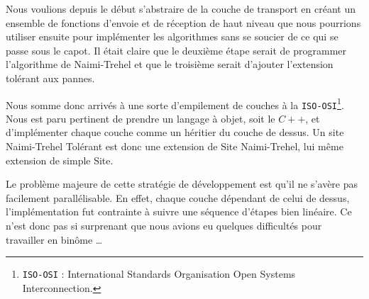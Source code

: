 Nous voulions depuis le début s'abstraire de la couche de transport en créant un ensemble de fonctions d'envoie et de réception de haut niveau que nous pourrions utiliser ensuite pour implémenter les algorithmes sans se soucier de ce qui se passe \og sous le capot\fg{}. Il était claire que le deuxième étape serait de programmer l'algorithme de Naimi-Trehel et que le troisième serait d'ajouter l'extension tolérant aux pannes.

Nous somme donc arrivés à une sorte d'empilement de couches à la \texttt{ISO-OSI}\footnote{\texttt{ISO-OSI} : International Standards Organisation Open Systems Interconnection.}. Nous est paru pertinent de prendre un langage à objet, soit le $C++$, et d'implémenter chaque couche comme un héritier du couche de dessus. Un site Naimi-Trehel Tolérant est donc une extension de Site Naimi-Trehel, lui même extension de simple Site.

Le problème majeure de cette stratégie de développement est qu'il ne s'avère pas facilement parallélisable. En effet, chaque couche dépendant de celui de dessus, l'implémentation fut contrainte à suivre une séquence d'étapes bien linéaire. Ce n'est donc pas si surprenant que nous avions eu quelques difficultés pour travailler en binôme \dots
